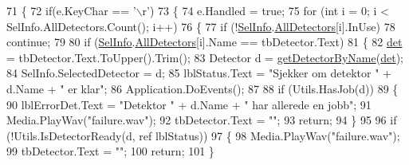 \begin{DoxyCode}
71         \{
72             \textcolor{keywordflow}{if}(e.KeyChar == \textcolor{charliteral}{'\(\backslash\)r'})
73             \{
74                 e.Handled = \textcolor{keyword}{true};
75                 \textcolor{keywordflow}{for} (\textcolor{keywordtype}{int} i = 0; i < SelInfo.AllDetectors.Count(); i++)
76                 \{
77                     \textcolor{keywordflow}{if} (!\hyperlink{class_scintilab_1_1_form_barcode_sample_wizard_abaafc00e1f7078936d2ff912da04c9af}{SelInfo}.\hyperlink{class_scintilab_1_1_selection_info_a23c987113ffb2b75a7253ae95579901c}{AllDetectors}[i].InUse)
78                         \textcolor{keywordflow}{continue};
79 
80                     \textcolor{keywordflow}{if} (\hyperlink{class_scintilab_1_1_form_barcode_sample_wizard_abaafc00e1f7078936d2ff912da04c9af}{SelInfo}.\hyperlink{class_scintilab_1_1_selection_info_a23c987113ffb2b75a7253ae95579901c}{AllDetectors}[i].Name == tbDetector.Text)
81                     \{
82                         \hyperlink{class_scintilab_1_1_form_barcode_sample_wizard_a7b70de65be45e93c95b176887be00dd0}{det} = tbDetector.Text.ToUpper().Trim();
83                         Detector d = \hyperlink{class_scintilab_1_1_form_barcode_sample_wizard_ad7e7a4f0718e414a0a11cd67c1066e3f}{getDetectorByName}(\hyperlink{class_scintilab_1_1_form_barcode_sample_wizard_a7b70de65be45e93c95b176887be00dd0}{det});
84                         SelInfo.SelectedDetector = d;
85                         lblStatus.Text = \textcolor{stringliteral}{"Sjekker om detektor "} + d.Name + \textcolor{stringliteral}{" er klar"};
86                         Application.DoEvents();
87 
88                         \textcolor{keywordflow}{if} (Utils.HasJob(d))
89                         \{
90                             lblErrorDet.Text = \textcolor{stringliteral}{"Detektor "} + d.Name + \textcolor{stringliteral}{" har allerede en jobb"};
91                             Media.PlayWav(\textcolor{stringliteral}{"failure.wav"});
92                             tbDetector.Text = \textcolor{stringliteral}{""};
93                             \textcolor{keywordflow}{return};
94                         \}
95 
96                         \textcolor{keywordflow}{if} (!Utils.IsDetectorReady(d, ref lblStatus))
97                         \{
98                             Media.PlayWav(\textcolor{stringliteral}{"failure.wav"});
99                             tbDetector.Text = \textcolor{stringliteral}{""};
100                             \textcolor{keywordflow}{return};
101                         \}

\end{DoxyCode}
